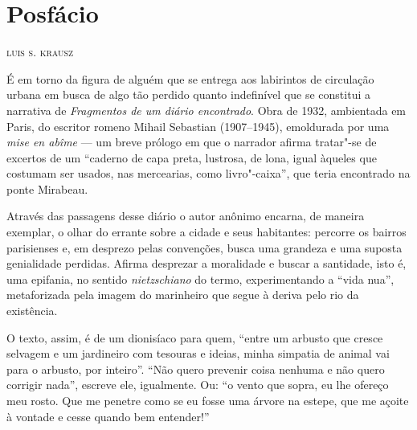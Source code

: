 
\chapter*{Posfácio }

\hfill\textsc{luis s. krausz}

\bigskip

\noindent{}É em torno da figura de alguém que se entrega aos labirintos de
circulação urbana em busca de algo tão perdido quanto indefinível que se
constitui a narrativa de \emph{Fragmentos de um diário encontrado}. Obra
de 1932, ambientada em Paris, do escritor romeno Mihail Sebastian
(1907--1945), emoldurada por uma \emph{mise en abîme} --- um breve prólogo
em que o narrador afirma tratar"-se de excertos de um ``caderno de capa
preta, lustrosa, de lona, igual àqueles que costumam ser usados, nas mercearias, como livro"-caixa'', que teria encontrado na ponte Mirabeau.

Através das passagens desse diário o
autor anônimo encarna, de maneira exemplar, o olhar do errante sobre a
cidade e seus habitantes: percorre os bairros parisienses e, em desprezo
pelas convenções, busca uma grandeza e uma suposta genialidade perdidas.
Afirma desprezar a moralidade e buscar a santidade, isto é,
uma epifania, no sentido \emph{nietzschiano} do termo, experimentando
a ``vida nua'', metaforizada pela imagem do marinheiro que segue à deriva
pelo rio da existência.

O texto, assim, é de um dionisíaco para quem, ``entre um arbusto que
cresce selvagem e um jardineiro com tesouras e ideias, minha simpatia de
animal vai para o arbusto, por inteiro''. ``Não quero prevenir coisa
nenhuma e não quero corrigir nada'', escreve ele, igualmente. Ou: ``o
vento que sopra, eu lhe ofereço meu rosto. Que me penetre como se eu
fosse uma árvore na estepe, que me açoite à vontade e cesse quando bem
entender!''

